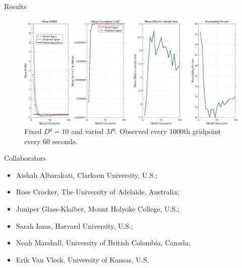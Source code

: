 \documentclass[aspectratio=169]{beamer}
\begin{document}
\begin{frame}{Results}
    \begin{figure}[H]
        \centering
        \includegraphics[width=\textwidth]{figures/SWE_physical_proj_DMD_inth1000.png}
        \caption{Fixed $D^q = 10$ and varied $M^q$.  Observed every 1000th gridpoint every 60 seconds.}
    \end{figure}
\end{frame}


\begin{frame}{Collaborators}
    \begin{itemize}
        \item Aishah Albarakati, Clarkson University, U.S.;
        \item Rose Crocker, The University of Adelaide, Australia;
        \item Juniper Glass-Klaiber, Mount Holyoke College, U.S.;
        \item Sarah Iams, Harvard University, U.S.;
        \item Noah Marshall, University of British Colombia, Canada;
        \item Erik Van Vleck, University of Kansas, U.S.
    \end{itemize}
\end{frame}
\end{document}
